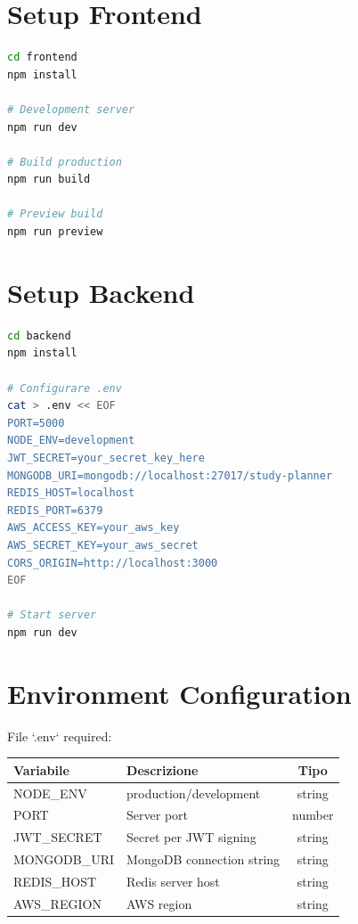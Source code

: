 \documentclass[12pt,a4paper]{report}
\begin{document}
\section{Setup Frontend}

\begin{lstlisting}[language=bash]
cd frontend
npm install

# Development server
npm run dev

# Build production
npm run build

# Preview build
npm run preview
\end{lstlisting}

\section{Setup Backend}

\begin{lstlisting}[language=bash]
cd backend
npm install

# Configurare .env
cat > .env << EOF
PORT=5000
NODE_ENV=development
JWT_SECRET=your_secret_key_here
MONGODB_URI=mongodb://localhost:27017/study-planner
REDIS_HOST=localhost
REDIS_PORT=6379
AWS_ACCESS_KEY=your_aws_key
AWS_SECRET_KEY=your_aws_secret
CORS_ORIGIN=http://localhost:3000
EOF

# Start server
npm run dev
\end{lstlisting}

\section{Environment Configuration}

File `.env` required:

\begin{table}[H]
    \centering
    \begin{tabular}{|l|l|c|}
        \hline
        \textbf{Variabile} & \textbf{Descrizione} & \textbf{Tipo} \\
        \hline
        NODE\_ENV & production/development & string \\
        \hline
        PORT & Server port & number \\
        \hline
        JWT\_SECRET & Secret per JWT signing & string \\
        \hline
        MONGODB\_URI & MongoDB connection string & string \\
        \hline
        REDIS\_HOST & Redis server host & string \\
        \hline
        AWS\_REGION & AWS region & string \\
        \hline
    \end{tabular}
\end{table}
\end{document}
